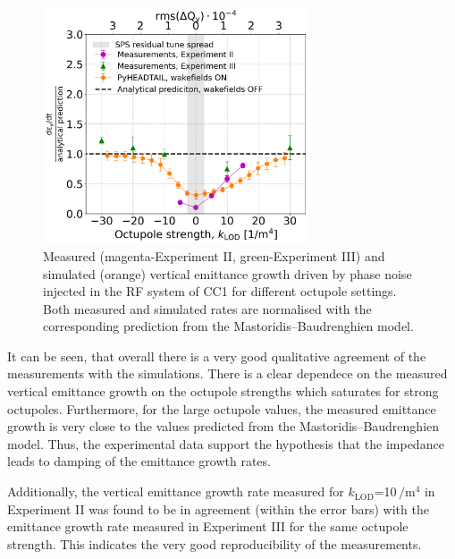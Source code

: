 \begin{figure}[!htb]
   \centering         
   \includegraphics[width=0.7\textwidth]{images/Ch8/deyRates_sps_270GeV_PN1e-8_400MHz_SPS_NewWakesAllcontributions_appendWakes_y-plane_WakesONvsOFF_QpxQpy1_6D_Nb5e5_intensity3e10Scan_simulations_vs_measurements_magenta_new_legend_IPAC22_May_and_September_2022_for_thesis.png}
       \caption{Measured (magenta-Experiment II, green-Experiment III) and simulated (orange) vertical emittance growth driven by phase noise injected in the RF system of CC1 for different octupole settings. Both measured and simulated rates are normalised with the corresponding prediction from the Mastoridis--Baudrenghien model.}
       \label{fig:cc_md_2022_measurement_vs_pyheadtail_simualtion_sep22}
\end{figure}


It can be seen, that overall there is a very good qualitative agreement of the measurements with the simulations. There is a clear dependece on the measured vertical emittance growth on the octupole strengths which saturates for strong octupoles. Furthermore, for the large octupole values, the measured emittance growth is very close to the values predicted from the Mastoridis--Baudrenghien model. Thus, the experimental data support the hypothesis that the impedance leads to damping of the emittance growth rates. 

Additionally, the vertical emittance growth rate measured for $k_\mathrm{LOD}$=10\,$\mathrm{/m^4}$ in Experiment II was found to be in agreement (within the error bars) with the emittance growth rate measured in Experiment III for the same octupole strength. This indicates the very good reproducibility of the measurements.

